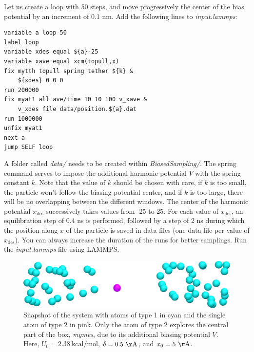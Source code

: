\documentclass[9pt,tutorial]{livecoms}
\begin{document}
Let us create a loop with 50 steps, and move progressively the center of the bias potential by an increment of 0.1 nm. Add the following lines to \textit{input.lammps}:
{\normalsize \begin{verbatim}
variable a loop 50
label loop
variable xdes equal ${a}-25
variable xave equal xcm(topull,x)
fix mytth topull spring tether ${k} &
    ${xdes} 0 0 0
run 200000
fix myat1 all ave/time 10 10 100 v_xave &
    v_xdes file data/position.${a}.dat
run 1000000
unfix myat1
next a
jump SELF loop
\end{verbatim}}
A folder called \textit{data/} needs to be created within \textit{BiasedSampling/}. The spring command serves to impose the additional harmonic potential $V$ with the spring constant $k$. Note that the value of $k$ should be chosen with care, if $k$ is too small, the particle won't follow the biasing potential center, and if $k$ is too large, there will be no overlapping between the different windows. The center of the harmonic potential $x_\text{des}$ successively takes values from -25 to 25. For each value of $x_\text{des}$, an equilibration step of 0.4 ns is performed, followed by a step of 2 ns during which the position along $x$ of the particle is saved in data files (one data file per value of $x_\text{des}$). You can always increase the duration of the runs for better samplings. Run the \textit{input.lammps}  file using LAMMPS.

\begin{figure}
\centering
\includegraphics[width=\linewidth]{US-system-biased}
\caption{Snapshot of the system with atoms of type 1 in cyan and the single atom of type 2 in pink. Only the atom of type 2 explores the central part of the box, \textit{mymes}, due to its additional biasing potential $V$. Here, $U_0 = 2.38~\text{kcal/mol}$, $\delta = 0.5~\mathrm{\AA{}}$, and $x_0 = 5~\mathrm{\AA{}}$.}
\label{fig:US-system-biased}
\end{figure}
    
\end{document}
